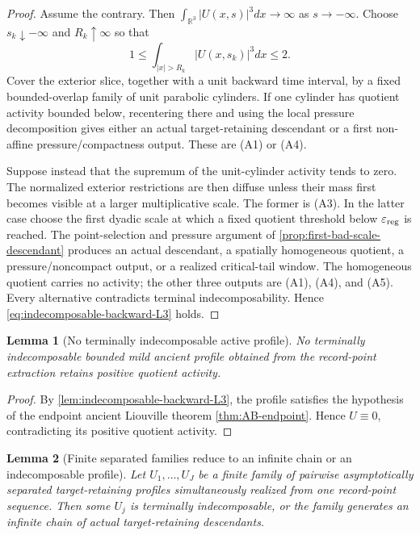 \documentclass[11pt]{amsart}
\numberwithin{equation}{section}
\theoremstyle{plain}
\newtheorem{lemma}[lemma]{Lemma}
\theoremstyle{definition}
\theoremstyle{remark}
\begin{document}
\begin{proof}
Assume the contrary.  Then
\(\int_{\mathbb R^3}|U(x,s)|^3dx\to\infty\) as \(s\to-\infty\).
Choose \(s_k\downarrow-\infty\) and \(R_k\uparrow\infty\) so that
\[
 1\le\int_{|x|>R_k}|U(x,s_k)|^3dx\le2.
\]
Cover the exterior slice, together with a unit backward time interval, by a
fixed bounded-overlap family of unit parabolic cylinders.  If one cylinder
has quotient activity bounded below, recentering there and using the local
pressure decomposition gives either an actual target-retaining descendant or
a first non-affine pressure/compactness output.  These are
\textup{(A1)} or \textup{(A4)}.

Suppose instead that the supremum of the unit-cylinder activity tends to zero.
The normalized exterior restrictions are then diffuse unless their mass first
becomes visible at a larger multiplicative scale.  The former is
\textup{(A3)}.  In the latter case choose the first dyadic scale at which a
fixed quotient threshold below \(\varepsilon_{\rm reg}\) is reached.  The
point-selection and pressure argument of
\cref{prop:first-bad-scale-descendant} produces an actual descendant, a
spatially homogeneous quotient, a pressure/noncompact output, or a realized
critical-tail window.  The homogeneous quotient carries no activity; the
other three outputs are \textup{(A1)}, \textup{(A4)}, and \textup{(A5)}.
Every alternative contradicts terminal indecomposability.  Hence
\eqref{eq:indecomposable-backward-L3} holds.
\end{proof}

\begin{lemma}[No terminally indecomposable active profile]
\label{lem:no-terminally-indecomposable-profile}
No terminally indecomposable bounded mild ancient profile obtained from the
record-point extraction retains positive quotient activity.
\end{lemma}

\begin{proof}
By \cref{lem:indecomposable-backward-L3}, the profile satisfies the hypothesis
of the endpoint ancient Liouville theorem
\cref{thm:AB-endpoint}.  Hence \(U\equiv0\), contradicting its positive
quotient activity.
\end{proof}

\begin{lemma}[Finite separated families reduce to an infinite chain or an
indecomposable profile]
\label{lem:finite-separated-family-reduction}
Let \(U_1,\ldots,U_J\) be a finite family of pairwise asymptotically separated
target-retaining profiles simultaneously realized from one record-point
sequence.  Then some \(U_j\) is terminally indecomposable, or the family
generates an infinite chain of actual target-retaining descendants.
\end{lemma}
\end{document}
